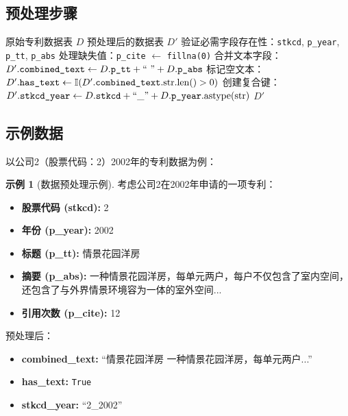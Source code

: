 \documentclass[12pt,a4paper]{article}
\theoremstyle{definition}
\newtheorem{example}{示例}[section]
\begin{document}
\subsection{预处理步骤}

\begin{algorithm}[H]
    \caption{数据预处理流程}
    \label{alg:preprocessing}
    \begin{algorithmic}[1]
        \Require 原始专利数据表 $D$
        \Ensure 预处理后的数据表 $D'$
        \State 验证必需字段存在性：\texttt{stkcd}, \texttt{p\_year}, \texttt{p\_tt}, \texttt{p\_abs}
        \State 处理缺失值：\texttt{p\_cite} $\leftarrow$ \texttt{fillna(0)}
        \State 合并文本字段：
        \State \quad $D'.\text{\texttt{combined\_text}} \leftarrow D.\text{\texttt{p\_tt}} + \text{`` ''} + D.\text{\texttt{p\_abs}}$
        \State 标记空文本：
        \State \quad $D'.\text{\texttt{has\_text}} \leftarrow \mathbb{I}(D'.\text{\texttt{combined\_text}}.\text{str.len()} > 0)$
        \State 创建复合键：
        \State \quad $D'.\text{\texttt{stkcd\_year}} \leftarrow D.\text{\texttt{stkcd}} + \text{``\_''} + D.\text{\texttt{p\_year}}.\text{astype(str)}$
        \State \Return $D'$
    \end{algorithmic}
\end{algorithm}

\subsection{示例数据}

以公司2（股票代码：2）2002年的专利数据为例：

\begin{example}[数据预处理示例]
\label{ex:preprocessing}
考虑公司2在2002年申请的一项专利：

\begin{itemize}
    \item \textbf{股票代码 (stkcd):} 2
    \item \textbf{年份 (p\_year):} 2002
    \item \textbf{标题 (p\_tt):} 情景花园洋房
    \item \textbf{摘要 (p\_abs):} 一种情景花园洋房，每单元两户，每户不仅包含了室内空间，还包含了与外界情景环境容为一体的室外空间...
    \item \textbf{引用次数 (p\_cite):} 12
\end{itemize}

预处理后：
\begin{itemize}
    \item \textbf{combined\_text:} ``情景花园洋房 一种情景花园洋房，每单元两户...''
    \item \textbf{has\_text:} \texttt{True}
    \item \textbf{stkcd\_year:} ``2\_2002''
\end{itemize}
\end{example}
\end{document}
